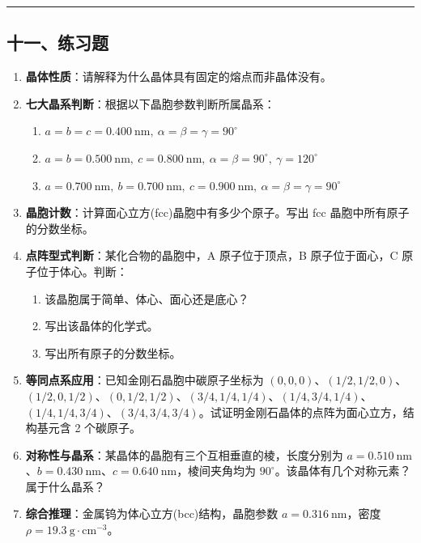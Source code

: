 \begin{center}\rule{0.5\linewidth}{0.5pt}\end{center}

\subsection{十一、练习题}\label{ux5341ux4e00ux7ec3ux4e60ux9898}

\begin{enumerate}
\def\labelenumi{\arabic{enumi}.}
\item
  \textbf{晶体性质}：请解释为什么晶体具有固定的熔点而非晶体没有。
\item
  \textbf{七大晶系判断}：根据以下晶胞参数判断所属晶系：

  \begin{enumerate}
  \def\labelenumii{(\arabic{enumii})}
  \tightlist
  \item
    \(a = b = c = 0.400\ \mathrm{nm},\ \alpha = \beta = \gamma = 90^\circ\)
  \item
    \(a = b = 0.500\ \mathrm{nm},\ c = 0.800\ \mathrm{nm},\ \alpha = \beta = 90^\circ,\ \gamma = 120^\circ\)
  \item
    \(a = 0.700\ \mathrm{nm},\ b = 0.700\ \mathrm{nm},\ c = 0.900\ \mathrm{nm},\ \alpha = \beta = \gamma = 90^\circ\)
  \end{enumerate}
\item
  \textbf{晶胞计数}：计算面心立方(fcc)晶胞中有多少个原子。写出 fcc 晶胞中所有原子的分数坐标。
\item
  \textbf{点阵型式判断}：某化合物的晶胞中，A 原子位于顶点，B 原子位于面心，C 原子位于体心。判断：

  \begin{enumerate}
  \def\labelenumii{(\arabic{enumii})}
  \tightlist
  \item
    该晶胞属于简单、体心、面心还是底心？
  \item
    写出该晶体的化学式。
  \item
    写出所有原子的分数坐标。
  \end{enumerate}
\item
  \textbf{等同点系应用}：已知金刚石晶胞中碳原子坐标为 \((0, 0, 0)\)、\((1/2, 1/2, 0)\)、\((1/2, 0, 1/2)\)、\((0, 1/2, 1/2)\)、\((3/4, 1/4, 1/4)\)、\((1/4, 3/4, 1/4)\)、\((1/4, 1/4, 3/4)\)、\((3/4, 3/4, 3/4)\)。试证明金刚石晶体的点阵为面心立方，结构基元含 2 个碳原子。
\item
  \textbf{对称性与晶系}：某晶体的晶胞有三个互相垂直的棱，长度分别为 \(a = 0.510\ \mathrm{nm}\)、\(b = 0.430\ \mathrm{nm}\)、\(c = 0.640\ \mathrm{nm}\)，棱间夹角均为 \(90^\circ\)。该晶体有几个对称元素？属于什么晶系？
\item
  \textbf{综合推理}：金属钨为体心立方(bcc)结构，晶胞参数 \(a = 0.316\ \mathrm{nm}\)，密度 \(\rho = 19.3\ \mathrm{g\cdot cm^{-3}}\)。


\end{enumerate}
